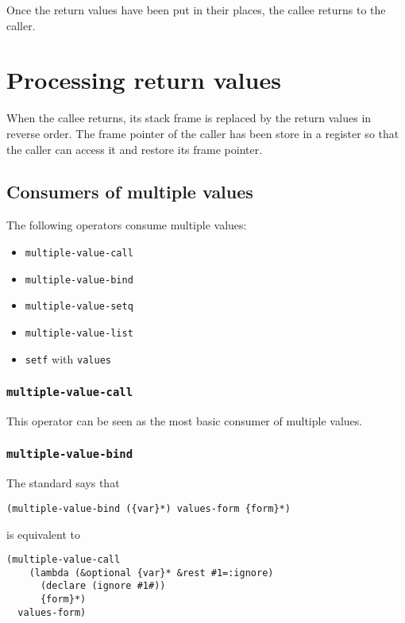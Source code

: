Once the return values have been put in their places, the callee
returns to the caller.

\section{Processing return values}

When the callee returns, its stack frame is replaced by the return
values in reverse order.  The frame pointer of the caller has been
store in a register so that the caller can access it and restore its
frame pointer.

\subsection{Consumers of multiple values}

The following operators consume multiple values:

\begin{itemize}
\item \texttt{multiple-value-call}
\item \texttt{multiple-value-bind}
\item \texttt{multiple-value-setq}
\item \texttt{multiple-value-list}
\item \texttt{setf} with \texttt{values}
\end{itemize}

\subsubsection{\texttt{multiple-value-call}}

This operator can be seen as the most basic consumer of multiple
values.

\subsubsection{\texttt{multiple-value-bind}}

The standard says that

\begin{verbatim}
(multiple-value-bind ({var}*) values-form {form}*)
\end{verbatim}

is equivalent to

\begin{verbatim}
(multiple-value-call
    (lambda (&optional {var}* &rest #1=:ignore)
      (declare (ignore #1#))
      {form}*)
  values-form)
\end{verbatim}

